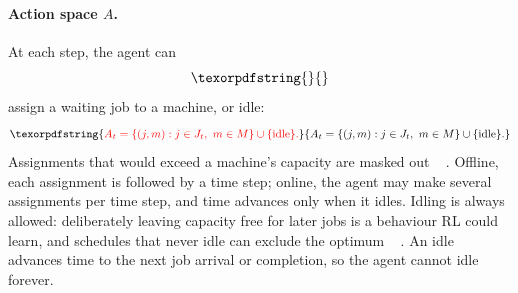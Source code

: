 \documentclass[12pt]{article}
\providecommand{\DIFaddtex}[1]{{\color{red}#1}} %
\providecommand{\DIFdeltex}[1]{} %
\providecommand{\DIFaddbegin}{} %
\providecommand{\DIFaddend}{} %
\providecommand{\DIFdelbegin}{} %
\providecommand{\DIFdelend}{} %
\providecommand{\DIFadd}[1]{\texorpdfstring{\DIFaddtex{#1}}{#1}} %
\providecommand{\DIFdel}[1]{\texorpdfstring{\DIFdeltex{#1}}{}} %
\providecommand{\DIFscaledelfig}{0.5}
\newlength{\DIFdelgraphicswidth} %
\newlength{\DIFdelgraphicsheight} %
\providecommand{\DIFaddincludegraphics}[2][]{{\color{blue}\fbox{\DIFOincludegraphics[#1]{#2}}}} %
\providecommand{\DIFdelincludegraphics}[2][]{%
\sbox{\DIFdelgraphicsbox}{\DIFOincludegraphics[#1]{#2}}%
\settoboxwidth{\DIFdelgraphicswidth}{\DIFdelgraphicsbox} %
\settoboxtotalheight{\DIFdelgraphicsheight}{\DIFdelgraphicsbox} %
\scalebox{\DIFscaledelfig}{%
\parbox[b]{\DIFdelgraphicswidth}{\usebox{\DIFdelgraphicsbox}\\[-\baselineskip] \rule{\DIFdelgraphicswidth}{0em}}\llap{\resizebox{\DIFdelgraphicswidth}{\DIFdelgraphicsheight}{%
\setlength{\unitlength}{\DIFdelgraphicswidth}%
\begin{picture}(1,1)%
\thicklines\linethickness{2pt} %
{\color[rgb]{1,0,0}\put(0,0){\framebox(1,1){}}}%
{\color[rgb]{1,0,0}\put(0,0){\line( 1,1){1}}}%
{\color[rgb]{1,0,0}\put(0,1){\line(1,-1){1}}}%
\end{picture}%
}\hspace*{3pt}}} %
} %
\DeclareRobustCommand{\DIFaddbegin}{\DIFOaddbegin \let\includegraphics\DIFaddincludegraphics} %
\DeclareRobustCommand{\DIFaddend}{\DIFOaddend \let\includegraphics\DIFOincludegraphics} %
\DeclareRobustCommand{\DIFdelbegin}{\DIFOdelbegin \let\includegraphics\DIFdelincludegraphics} %
\DeclareRobustCommand{\DIFdelend}{\DIFOaddend \let\includegraphics\DIFOincludegraphics} %
\begin{document}
\paragraph{\DIFadd{Action space $A$.}} \DIFaddend At each step, the agent can \DIFdelbegin \DIFdel{take actions of assigning waiting jobs to machines, and/or idling,
}\begin{displaymath}\DIFdel{%

    \mathcal{A}_t = \{(j, m) : j \in J_t,\ m \in M\} \cup \{\text{idle}\}.
}\end{displaymath}%
\DIFdelend \DIFaddbegin \DIFadd{assign a waiting job to a machine, or idle:
}\begin{equation}\DIFadd{\label{eq:action-flat}
    A_t = \{(j, m) : j \in J_t,\ m \in M\} \cup \{\text{idle}\}.
}\end{equation}\DIFaddend 
\DIFdelbegin \DIFdel{For the offline case, an agent can only produce a single action at each time step. For the onlinecase, an agent can continuously do actions at the same step$t$, only progressing to the next time step when it decides to idle}\DIFdelend \DIFaddbegin \DIFadd{Assignments that would exceed a machine's capacity are masked out \mbox{%
\cite{huang2020invalidmasking}}\hskip0pt%
. Offline, each assignment is followed by a time step; online, the agent may make several assignments per time step, and time advances only when it idles. Idling is always allowed: deliberately leaving capacity free for later jobs is a behaviour RL could learn, and schedules that never idle can exclude the optimum \mbox{%
\cite{giffler1960active}}\hskip0pt%
. An idle advances time to the next job arrival or completion, so the agent cannot idle forever}\DIFaddend .
\end{document}

